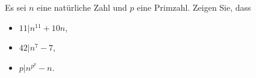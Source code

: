 
\begin{exercise}

Es sei $n$ eine natürliche Zahl und $p$ eine Primzahl. Zeigen Sie, dass

\begin{itemize}
    \item $11 | n^{11} + 10n$,
    \item $42 | n^7 - 7$,
    \item $p | n^{p^p} -n$.
\end{itemize}

\end{exercise}


\begin{solution}

\phantom{}

\end{solution}

